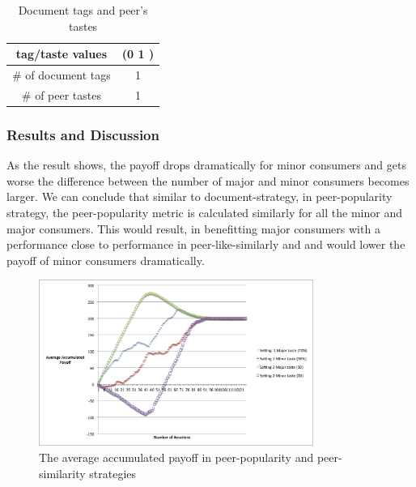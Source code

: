 \documentclass [12pt]{article} \usepackage{multicol}
\begin{document}
\begin{table}[h!]
\caption{Document tags and peer's tastes}

\begin{center}

\begin{tabular}{|c|c|}
\hline tag/taste values & (0 1 )\\
\hline \# of document tags   &  1\\ \hline 
\# of peer tastes  &  1 \\ \hline 
\end{tabular}

\end{center}
\label{default}
\end{table}


\subsubsection{Results and Discussion}

As the result shows, the payoff drops dramatically for minor consumers and gets worse the difference between 
the number of major and minor consumers becomes larger. We can conclude that similar to document-strategy,
in peer-popularity strategy, the peer-popularity metric is calculated similarly for all the minor and major consumers.
This would result, in benefitting major consumers with a performance close to performance in peer-like-similarly and
and would lower the payoff of minor consumers dramatically.  

\begin{figure}[h!]
\begin{center}
\includegraphics[width=0.8\textwidth,center]{images/EXP12-peer-pop-twoSettings-MajorMinor}
\caption{The average accumulated payoff in peer-popularity and peer-similarity strategies}
\end{center}
\end{figure}
\end{document}
